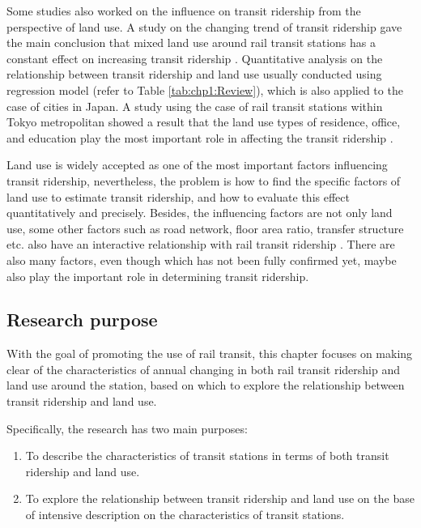 %
Some studies also worked on the influence on transit ridership from the perspective of land use. A study on the changing trend of transit ridership gave the main conclusion that mixed land use around rail transit stations has a constant effect on increasing transit ridership \cite{takashi2015study}. Quantitative analysis on the relationship between transit ridership and land use usually conducted using regression model (refer to Table \ref{tab:chp1:Review}), which is also applied to the case of cities in Japan. A study using the case of rail transit stations within Tokyo metropolitan showed a result that the land use types of residence, office, and education play the most important role in affecting the transit ridership \cite{tadakatsu2015empirical}.

%
Land use is widely accepted as one of the most important factors influencing transit ridership, nevertheless, the problem is how to find the specific factors of land use to estimate transit ridership, and how to evaluate this effect quantitatively and precisely. Besides, the influencing factors are not only land use, some other factors such as road network, floor area ratio, transfer structure etc. also have an interactive relationship with rail transit ridership \cite{kondo2010railway,inohae2009study}. There are also many factors, even though which has not been fully confirmed yet, maybe also play the important role in determining transit ridership.

%
\subsection{Research purpose}
%
With the goal of promoting the use of rail transit, this chapter focuses on making clear of the characteristics of annual changing in both rail transit ridership and land use around the station, based on which to explore the relationship between transit ridership and land use. 

%
Specifically, the research has two main purposes: 
\begin{enumerate}
	\setlength{\parskip}{0\baselineskip} %
	\item To describe the characteristics of transit stations in terms of both transit ridership and land use.  
	\item To explore the relationship between transit ridership and land use on the base of intensive description on the characteristics of transit stations. 
	\setlength{\parskip}{0.7\baselineskip} %
\end{enumerate}

